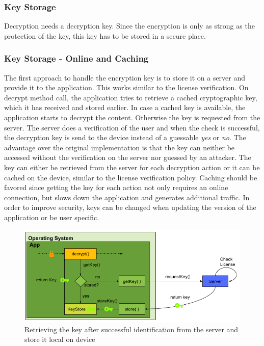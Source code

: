 \subsubsection{Key Storage} \label{section:counter-replace-encryption-key}
Decryption needs a decryption key.
Since the encryption is only as strong as the protection of the key, this key has to be stored in a secure place.

\subsubsection{Key Storage - Online and Caching} \label{section:counter-replace-encryption-key-online}
The first approach to handle the encryption key is to store it on a server and provide it to the application.
This works similar to the license verification.
\newline
On decrypt method call, the application tries to retrieve a cached cryptographic key, which it has received and stored earlier.
In case a cached key is available, the application starts to decrypt the content.
Otherwise the key is requested from the server.
The server does a verification of the user and when the check is successful, the decryption key is send to the device instead of a guessable \textit{yes} or \textit{no}.
The advantage over the original implementation is that the key can neither be accessed without the verification on the server nor guessed by an attacker.
\newline
The key can either be retrieved from the server for each decryption action or it can be cached on the device, similar to the license verification policy.
Caching should be favored since getting the key for each action not only requires an online connection, but slows down the application and generates additional traffic.
\newline
In order to improve security, keys can be changed when updating the version of the application or be user specific.
\begin{figure}[h]
    \centering
    \includegraphics[width=1\textwidth]{data/encryptionKeyServer.png}
    \caption{Retrieving the key after successful identification from the server and store it local on device}
    \label{fig:encryptionKeyServer}
\end{figure}

